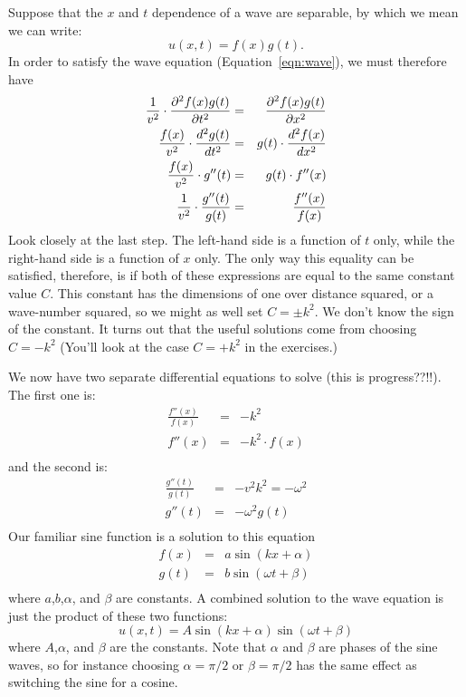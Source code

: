 \documentclass[12pt]{article}
\begin{document}
Suppose that the $x$ and $t$ dependence of a wave are separable, by which we mean we can write:
\begin{equation}
u(x,t) = f(x) g(t).
\end{equation}
In order to satisfy the wave equation (Equation~\ref{eqn:wave}), we must therefore have 
\begin{eqnarray*}
\frac{1}{v^2} \cdot \frac{\partial^2 f(x)g(t)}{\partial t^2} & = & \frac{\partial^2 f(x)g(t)}{\partial x^2}  \\
\frac{f(x)}{v^2} \cdot \frac{d^2 g(t)}{d t^2} & = & g(t) \cdot \frac{d^2 f(x)}{d x^2}  \\
\frac{f(x)}{v^2} \cdot g''(t) & = & g(t) \cdot f''(x)  \\
\frac{1}{v^2} \cdot \frac{g''(t)}{g(t)} & = & \frac{f''(x)}{f(x)}  \\
\end{eqnarray*}
Look closely at the last step.  The left-hand side is a function of $t$ only, while the right-hand side is a function of $x$ only.  The only way this equality can be satisfied, therefore, is if both of these expressions are equal to the same constant value $C$.  This constant has the dimensions of one over distance squared, or a wave-number squared, so we might as well set $C = \pm k^2$.  We don't know the sign of the constant.  It turns out that the useful solutions come from choosing $C = -k^2$ (You'll look at the case $C = +k^2$ in the exercises.) 

We now have two separate differential equations to solve (this is progress??!!).  The first one is:
\begin{eqnarray*}
\frac{f''(x)}{f(x)} & = & -k^2\\
f''(x) & = & -k^2 \cdot f(x) \\
\end{eqnarray*}
and the second is: 
\begin{eqnarray*}
\frac{g''(t)}{g(t)} & = & -v^2 k^2 = -\omega^2 \\
g''(t)& = & -\omega^2 g(t)\\
\end{eqnarray*}
Our familiar sine function is a solution to this equation
\begin{eqnarray}
f(x) & =  & a \sin (kx + \alpha) \\
g(t) & = & b \sin (\omega t + \beta) \\
\end{eqnarray}
where $a$,$b$,$\alpha$, and $\beta$ are constants.  A combined solution to the wave equation is just the product of these two functions:
\begin{equation}\label{eqn:separable}
u(x,t) = A \sin (kx + \alpha) \sin (\omega t + \beta)
\end{equation}
where $A$,$\alpha$, and $\beta$ are the constants.  Note that $\alpha$
and $\beta$ are phases of the sine waves, so for instance choosing
$\alpha=\pi/2$ or $\beta=\pi/2$ has the same effect as switching the
sine for a cosine.
\end{document}
